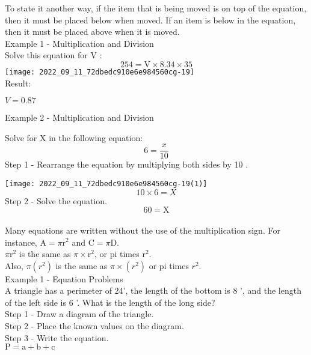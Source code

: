 To state it another way, if the item that is being moved is on top of the equation, then it must be placed below when moved. If an item is below in the equation, then it must be placed above when it is moved.\\

Example 1 - Multiplication and Division\\
Solve this equation for $\mathrm{V}$ :\\
$$
254=\mathrm{V} \times 8.34 \times 35
$$
\texttt{[image: 2022\_09\_11\_72dbedc910e6e984560cg-19]}\\

Result:

$V=0.87$

Example 2 - Multiplication and Division

Solve for $\mathrm{X}$ in the following equation:
$$
6=\frac{x}{10}
$$
Step 1 - Rearrange the equation by multiplying both sides by 10 .

\texttt{[image: 2022\_09\_11\_72dbedc910e6e984560cg-19(1)]}
$$
10 \times 6=X
$$
Step 2 - Solve the equation.
$$
60=\mathrm{X}
$$\\

Many equations are written without the use of the multiplication sign. For instance, $\mathrm{A}=\pi \mathrm{r}^{2}$ and $\mathrm{C}=\pi \mathrm{D}$.\\

$\pi \mathrm{r}^{2}$ is the same as $\pi \times \mathrm{r}^{2}$, or pi times $\mathrm{r}^{2}$.\\

Also, $\pi\left(r^{2}\right)$ is the same as $\pi \times\left(r^{2}\right)$ or pi times $r^{2}$.\\

Example 1 - Equation Problems\\

A triangle has a perimeter of 24', the length of the bottom is 8 ', and the length of the left side is 6 '. What is the length of the long side?\\

Step 1 - Draw a diagram of the triangle.\\

Step 2 - Place the known values on the diagram.\\

Step 3 - Write the equation.\\

$\mathrm{P}=\mathrm{a}+\mathrm{b}+\mathrm{c}$

